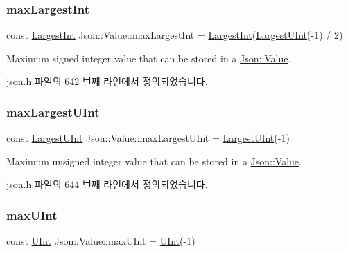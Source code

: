 \subsubsection{\texorpdfstring{max\+Largest\+Int}{maxLargestInt}}
{\footnotesize\ttfamily const \hyperlink{class_json_1_1_value_a1cbb82642ed05109b9833e49f042ece7}{Largest\+Int} Json\+::\+Value\+::max\+Largest\+Int = \hyperlink{class_json_1_1_value_a1cbb82642ed05109b9833e49f042ece7}{Largest\+Int}(\hyperlink{class_json_1_1_value_a6682a3684d635e03fc06ba229fa24eec}{Largest\+U\+Int}(-\/1) / 2)\hspace{0.3cm}{\ttfamily [static]}}



Maximum signed integer value that can be stored in a \hyperlink{class_json_1_1_value}{Json\+::\+Value}. 



json.\+h 파일의 642 번째 라인에서 정의되었습니다.

\mbox{\label{class_json_1_1_value_a8ddb32d9d55fa5323ae5135639dc2e31}} 
\subsubsection{\texorpdfstring{max\+Largest\+U\+Int}{maxLargestUInt}}
{\footnotesize\ttfamily const \hyperlink{class_json_1_1_value_a6682a3684d635e03fc06ba229fa24eec}{Largest\+U\+Int} Json\+::\+Value\+::max\+Largest\+U\+Int = \hyperlink{class_json_1_1_value_a6682a3684d635e03fc06ba229fa24eec}{Largest\+U\+Int}(-\/1)\hspace{0.3cm}{\ttfamily [static]}}



Maximum unsigned integer value that can be stored in a \hyperlink{class_json_1_1_value}{Json\+::\+Value}. 



json.\+h 파일의 644 번째 라인에서 정의되었습니다.

\mbox{\label{class_json_1_1_value_ac79e63ee68d3aa914bfd6988be669b87}} 
\subsubsection{\texorpdfstring{max\+U\+Int}{maxUInt}}
{\footnotesize\ttfamily const \hyperlink{class_json_1_1_value_a0933d59b45793ae4aade1757c322a98d}{U\+Int} Json\+::\+Value\+::max\+U\+Int = \hyperlink{class_json_1_1_value_a0933d59b45793ae4aade1757c322a98d}{U\+Int}(-\/1)\hspace{0.3cm}{\ttfamily [static]}}



